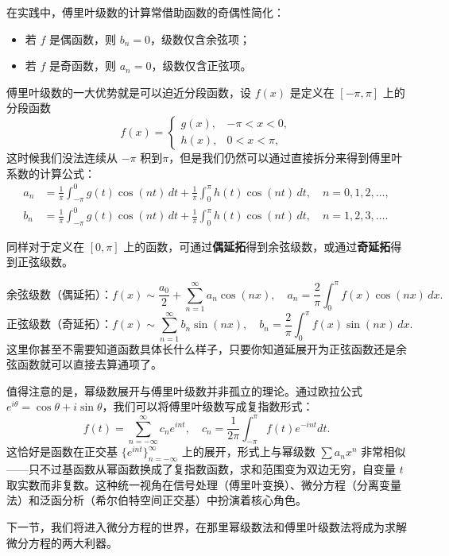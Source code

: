 \documentclass[UTF8]{ctexbook}
\begin{document}
在实践中，傅里叶级数的计算常借助函数的奇偶性简化：
\begin{itemize}
    \item 若 $f$ 是偶函数，则 $b_n = 0$，级数仅含余弦项；
    \item 若 $f$ 是奇函数，则 $a_n = 0$，级数仅含正弦项。
\end{itemize}



傅里叶级数的一大优势就是可以迫近分段函数，设 $f(x)$ 是定义在 $[-\pi,\pi]$ 上的分段函数
\[
f(x)=\begin{cases}
g(x), & -\pi < x < 0,\\
h(x), & 0 < x < \pi,
\end{cases}
\]
这时候我们没法连续从 $-\pi$ 积到$\pi$，但是我们仍然可以通过直接拆分来得到傅里叶系数的计算公式：
\[
\boxed{
\begin{aligned}
a_n &= \frac{1}{\pi} \int_{-\pi}^{0} g(t) \cos(nt) \, dt + \frac{1}{\pi} \int_{0}^{\pi} h(t) \cos(nt) \, dt, \quad n = 0,1,2,\dots, \\
b_n &= \frac{1}{\pi} \int_{-\pi}^{0} g(t) \cos(nt) \, dt + \frac{1}{\pi} \int_{0}^{\pi} h(t) \cos(nt) \, dt, \quad n = 1,2,3,\dots.
\end{aligned}
}
\]



同样对于定义在 $[0,\pi]$ 上的函数，可通过\textbf{偶延拓}得到余弦级数，或通过\textbf{奇延拓}得到正弦级数。


\[
\text{余弦级数（偶延拓）：}f(x) \sim \frac{a_0}{2} + \sum_{n=1}^{\infty} a_n \cos(nx),\quad 
a_n = \frac{2}{\pi}\int_0^{\pi} f(x)\cos(nx)\,dx.
\]
\[
\text{正弦级数（奇延拓）：}f(x) \sim \sum_{n=1}^{\infty} b_n \sin(nx),\quad 
b_n = \frac{2}{\pi}\int_0^{\pi} f(x)\sin(nx)\,dx.
\]
这里你甚至不需要知道函数具体长什么样子，只要你知道延展开为正弦函数还是余弦函数就可以直接去算通项了。

值得注意的是，幂级数展开与傅里叶级数并非孤立的理论。通过欧拉公式 $e^{i\theta} = \cos\theta + i\sin\theta$，我们可以将傅里叶级数写成复指数形式：
\[
f(t) = \sum_{n=-\infty}^{\infty} c_n e^{int}, \quad c_n = \frac{1}{2\pi} \int_{-\pi}^{\pi} f(t) e^{-int} dt.
\]
这恰好是函数在正交基 $\{e^{int}\}_{n=-\infty}^{\infty}$ 上的展开，形式上与幂级数 $\sum a_n x^n$ 非常相似——只不过基函数从幂函数换成了复指数函数，求和范围变为双边无穷，自变量 $t$ 取实数而非复数。这种统一视角在信号处理（傅里叶变换）、微分方程（分离变量法）和泛函分析（希尔伯特空间正交基）中扮演着核心角色。

下一节，我们将进入微分方程的世界，在那里幂级数法和傅里叶级数法将成为求解微分方程的两大利器。
\end{document}
